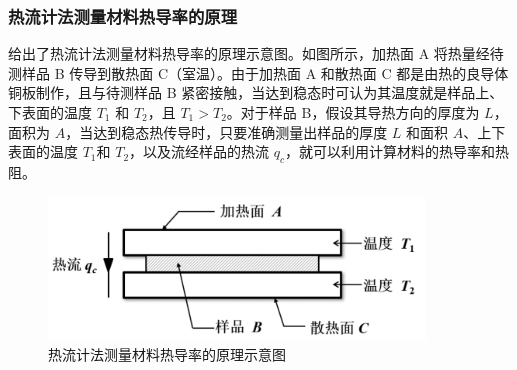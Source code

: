 \documentclass[a4paper,utf8]{article}
\begin{document}
        \subsubsection{热流计法测量材料热导率的原理}
             给出了热流计法测量材料热导率的原理示意图。如图所示，加热面 A 将热量经待测样品 B 传导到散热面 C（室温）。由于加热面 A 和散热面 C 都是由热的良导体铜板制作，且与待测样品 B 紧密接触，当达到稳态时可认为其温度就是样品上、下表面的温度 $T_1$ 和 $T_2$，且 $T_1 > T_2$。对于样品 B，假设其导热方向的厚度为 $L$，面积为 $A$，当达到稳态热传导时，只要准确测量出样品的厚度 $L$ 和面积 $A$、上下表面的温度 $T_1$和 $T_2$，以及流经样品的热流 $q_c$，就可以利用计算材料的热导率和热阻。
            \begin{figure}[!ht]\centering
                \includegraphics[width=100mm]{fg1.png}
                \caption{热流计法测量材料热导率的原理示意图 \label{fg:1}}
            \end{figure}
\end{document}
